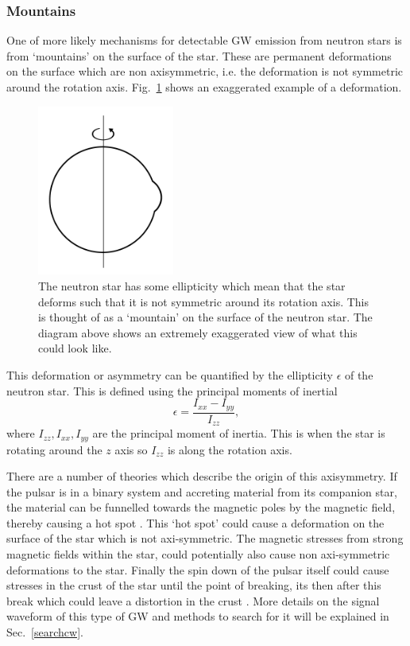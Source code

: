 \subsubsection{Mountains}

One of more likely mechanisms for detectable \gls{GW} emission from neutron stars is from `mountains' on the surface of the star.
These are permanent deformations on the surface which are non axisymmetric, i.e. the deformation is not symmetric around the rotation axis.
Fig.~\ref{intro:source:cw:mountain} shows an exaggerated example of a deformation.
\begin{figure}[h]
	\centering
	\includegraphics[width=0.4\textwidth]{C1_intro/neutron_star_mountain.pdf}
	\caption[Generating \glspl{CW} from mountains on neutron stars.]{The neutron star has some ellipticity which mean that the star deforms such that it is not symmetric around its rotation axis. This is thought of as a `mountain' on the surface of the neutron star. The diagram above shows an extremely exaggerated view of what this could look like.}
	\label{intro:source:cw:mountain}
\end{figure}

This deformation or asymmetry can be quantified by the ellipticity $\epsilon$ of the neutron star.
This is defined using the principal moments of inertial
\begin{equation}
\label{ellipticity}
\epsilon = \frac{I_{xx}-I_{yy}}{I_{zz}},
\end{equation}
where $I_{zz},I_{xx},I_{yy}$ are the principal moment of inertia.
This is when the star is rotating around the $z$ axis so $I_{zz}$ is along the rotation axis. 

There are a number of theories which describe the origin of this axisymmetry.
If the pulsar is in a binary system and accreting material from its companion star, the material can be funnelled towards the magnetic poles by the magnetic field, thereby causing a hot spot \citep{haskell2015DetectingGravitational}.
This `hot spot' could cause a deformation on the surface of the star which is not axi-symmetric. 
The magnetic stresses from strong magnetic fields within the star, could potentially also cause non axi-symmetric deformations to the star.
Finally the spin down of the pulsar itself could cause stresses in the crust of the star until the point of breaking, its then after this break which could leave a distortion in the crust \citep{becker2009NeutronStars}.
More details on the signal waveform of this type of \gls{GW} and methods to search for it will be explained in Sec.~\ref{searchcw}.
 
